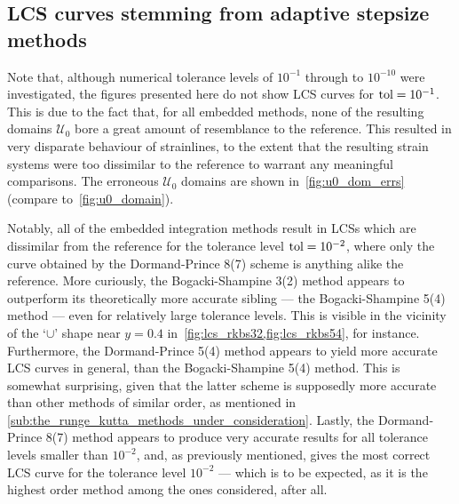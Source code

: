 \subsection{LCS curves stemming from adaptive stepsize methods}
\label{sub:lcs_curves_stemming_from_adaptive_stepsize_methods}

Note that, although numerical tolerance levels of $10^{-1}$ through to
$10^{-10}$ were investigated, the figures presented here do not show LCS curves
for $\textnormal{tol}=10^{-1}$. This is due to the fact that, for all
embedded methods, none of the resulting domains $\mathcal{U}_{0}$ bore
a great amount of resemblance to the reference. This resulted in very disparate
behaviour of strainlines, to the extent that the resulting strain systems were
too dissimilar to the reference to warrant any meaningful comparisons. The
erroneous $\mathcal{U}_{0}$ domains are shown in~\cref{fig:u0_dom_errs}
(compare to~\cref{fig:u0_domain}).

Notably, all of the embedded integration methods result in LCSs which are
dissimilar from the reference for the tolerance level $\textnormal{tol}=10^{-2}$,
where only the curve obtained by the Dormand-Prince 8(7) scheme is anything
alike the reference. More curiously, the Bogacki-Shampine 3(2) method appears
to outperform its theoretically more accurate sibling --- the
Bogacki-Shampine 5(4) method --- even for relatively
large tolerance levels. This is visible in the
vicinity of the `$\cup$' shape near $y=0.4$ in~\cref{fig:lcs_rkbs32,fig:lcs_rkbs54},
for instance. Furthermore, the Dormand-Prince 5(4) method appears to yield more
accurate LCS curves in general, than the Bogacki-Shampine 5(4) method. This
is somewhat surprising, given that the latter scheme is supposedly more accurate
than other methods of similar order, as mentioned in
\cref{sub:the_runge_kutta_methods_under_consideration}. Lastly, the
Dormand-Prince 8(7) method appears to produce very accurate results for all
tolerance levels smaller than $10^{-2}$, and, as previously mentioned, gives
the most correct LCS curve for the tolerance level $10^{-2}$
--- which is to be expected, as it is the highest order method among the ones
considered, after all.
\vspace{\fill}










